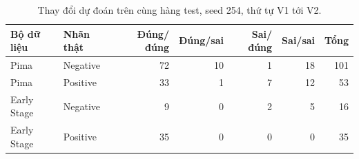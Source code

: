 \par\FloatBarrier\begin{table}[H]\centering\small{}\setlength{\tabcolsep}{5pt}
\caption{Thay đổi dự đoán trên cùng hàng test, seed 254, thứ tự V1 tới V2.}\begin{tabular}{llrrrrr}\toprule
Bộ dữ liệu & Nhãn thật & Đúng/đúng & Đúng/sai & Sai/đúng & Sai/sai & Tổng\\\midrule
Pima & Negative & 72 & 10 & 1 & 18 & 101\\
Pima & Positive & 33 & 1 & 7 & 12 & 53\\
Early Stage & Negative & 9 & 0 & 2 & 5 & 16\\
Early Stage & Positive & 35 & 0 & 0 & 0 & 35\\\bottomrule\end{tabular}\end{table}

